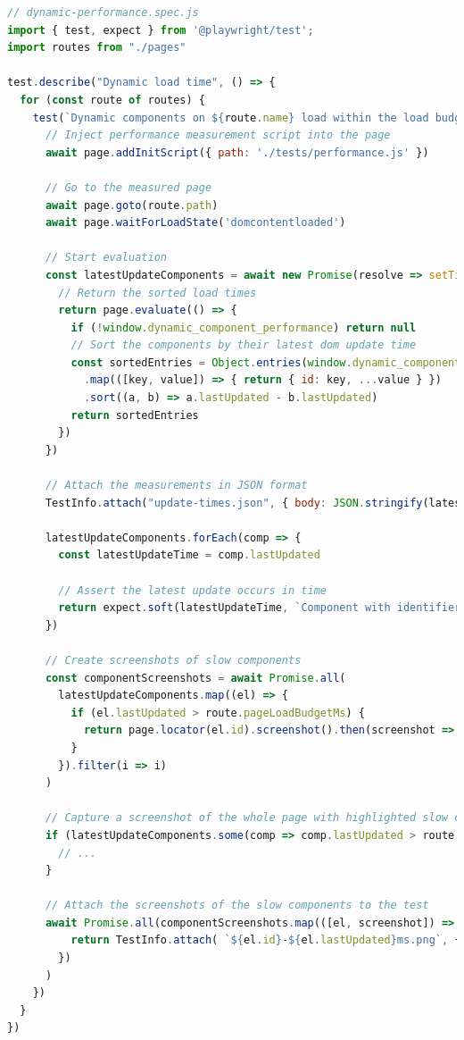 \documentclass[a4paper, 12pt]{article}
\begin{document}
\vspace{1cm}
\begin{lstlisting}[caption={Test file for component load times}, label={lst:dynamic-performance-spec}, language=JavaScript, escapechar=°]
// dynamic-performance.spec.js
import { test, expect } from '@playwright/test';
import routes from "./pages"

test.describe("Dynamic load time", () => {
  for (const route of routes) {
    test(`Dynamic components on ${route.name} load within the load budget`, { tag: [`@${route.name}`, '@componentLoad'] }, async ({ page }, TestInfo) => {
      // Inject performance measurement script into the page
      await page.addInitScript({ path: './tests/performance.js' })

      // Go to the measured page
      await page.goto(route.path)
      await page.waitForLoadState('domcontentloaded')

      // Start evaluation
      const latestUpdateComponents = await new Promise(resolve => setTimeout(resolve, 10_000)).then(() => {°\label{line:dynamic-performance-spec:maxTime}°
        // Return the sorted load times
        return page.evaluate(() => {
          if (!window.dynamic_component_performance) return null
          // Sort the components by their latest dom update time
          const sortedEntries = Object.entries(window.dynamic_component_performance)
            .map(([key, value]) => { return { id: key, ...value } })
            .sort((a, b) => a.lastUpdated - b.lastUpdated)
          return sortedEntries
        })
      })

      // Attach the measurements in JSON format
      TestInfo.attach("update-times.json", { body: JSON.stringify(latestUpdateComponents, null, 2), contentType: "application/json" })

      latestUpdateComponents.forEach(comp => {
        const latestUpdateTime = comp.lastUpdated

        // Assert the latest update occurs in time
        return expect.soft(latestUpdateTime, `Component with identifier ${comp.id} should load within ${route.pageLoadBudgetMs} ms`).toBeLessThan(route.pageLoadBudgetMs)
      })

      // Create screenshots of slow components
      const componentScreenshots = await Promise.all(
        latestUpdateComponents.map((el) => {
          if (el.lastUpdated > route.pageLoadBudgetMs) {
            return page.locator(el.id).screenshot().then(screenshot => [el, screenshot])
          }
        }).filter(i => i)
      )

      // Capture a screenshot of the whole page with highlighted slow components
      if (latestUpdateComponents.some(comp => comp.lastUpdated > route.pageLoadBudgetMs)){
        // ...
      }

      // Attach the screenshots of the slow components to the test
      await Promise.all(componentScreenshots.map(([el, screenshot]) => {
          return TestInfo.attach( `${el.id}-${el.lastUpdated}ms.png`, {body: screenshot, contentType: 'image/png'})
        })
      )
    })
  }
})
\end{lstlisting}
\end{document}
